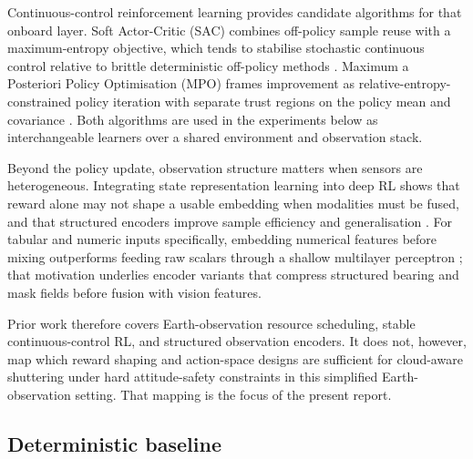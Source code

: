 Continuous-control reinforcement learning provides candidate algorithms for that onboard layer.
Soft Actor-Critic (SAC) combines off-policy sample reuse with a maximum-entropy objective, which tends to stabilise stochastic continuous control relative to brittle deterministic off-policy methods \citep{haarnoja2018sac}.
Maximum a Posteriori Policy Optimisation (MPO) frames improvement as relative-entropy-constrained policy iteration with separate trust regions on the policy mean and covariance \citep{abdolmaleki2018mpo}.
Both algorithms are used in the experiments below as interchangeable learners over a shared environment and observation stack.

Beyond the policy update, observation structure matters when sensors are heterogeneous.
Integrating state representation learning into deep RL shows that reward alone may not shape a usable embedding when modalities must be fused, and that structured encoders improve sample efficiency and generalisation \citep{bruin2018irl}.
For tabular and numeric inputs specifically, embedding numerical features before mixing outperforms feeding raw scalars through a shallow multilayer perceptron \citep{gorishniy2022revisiting}; that motivation underlies encoder variants that compress structured bearing and mask fields before fusion with vision features.

Prior work therefore covers Earth-observation resource scheduling, stable continuous-control RL, and structured observation encoders.
It does not, however, map which reward shaping and action-space designs are sufficient for cloud-aware shuttering under hard attitude-safety constraints in this simplified Earth-observation setting.
That mapping is the focus of the present report.

\subsection{Deterministic baseline}
\label{sec:baseline-intro}

